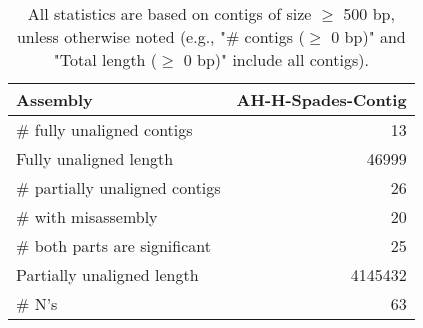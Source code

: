 \documentclass[12pt,a4paper]{article}
\begin{document}
\begin{table}[ht]
\begin{center}
\caption{All statistics are based on contigs of size $\geq$ 500 bp, unless otherwise noted (e.g., "\# contigs ($\geq$ 0 bp)" and "Total length ($\geq$ 0 bp)" include all contigs).}
\begin{tabular}{|l*{1}{|r}|}
\hline
Assembly & AH-H-Spades-Contig \\ \hline
\# fully unaligned contigs & 13 \\ \hline
Fully unaligned length & 46999 \\ \hline
\# partially unaligned contigs & 26 \\ \hline
\hspace{5mm}\# with misassembly & 20 \\ \hline
\hspace{5mm}\# both parts are significant & 25 \\ \hline
Partially unaligned length & 4145432 \\ \hline
\# N's & 63 \\ \hline
\end{tabular}
\end{center}
\end{table}
\end{document}
